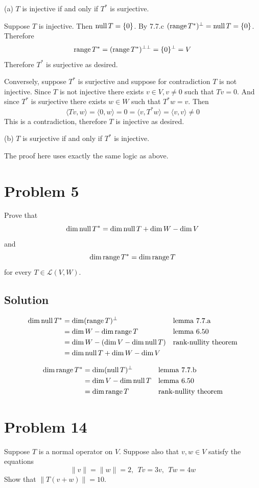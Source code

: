\documentclass{article}
\begin{document}
\vs

(a) $T$ is injective if and only if $T^*$ is surjective.

Suppose $T$ is injective. Then $\text{null}\, T=\{0\}$. By 7.7.c $(\text{range}\, T^*)^\perp=\text{null}\, T=\{0\}$. Therefore
\[\text{range}\, T^*=(\text{range}\, T^*)^{\perp\perp}=\{0\}^\perp=V\]
Therefore $T^*$ is surjective as desired.

\vs

Conversely, suppose $T^*$ is surjective and suppose for contradiction $T$ is not injective. Since $T$ is not injective there exists $v\in V, v\neq 0$ such that $Tv=0$. And since $T^*$ is surjective there exists $w\in W$ such that $T^*w=v$. Then
\[\langle Tv, w\rangle=\langle 0, w\rangle=0=\langle v, T^*w\rangle=\langle v,v\rangle\neq 0\]
This is a contradiction, therefore $T$ is injective as desired.

\vs

(b) $T$ is surjective if and only if $T^*$ is injective.

The proof here uses exactly the same logic as above.

\section*{Problem 5}
Prove that
\[\dim\text{null}\, T^*=\dim\text{null}\, T+\dim W-\dim V\]
and
\[\dim\text{range}\, T^*=\dim\text{range}\, T\]
for every $T\in\mathcal{L}(V,W)$.

\subsection*{Solution}
\begin{align*}
    \dim\text{null}\, T^*&=\dim(\text{range}\, T)^\perp&&\text{lemma 7.7.a}\\
    &=\dim W-\dim\text{range}\, T&&\text{lemma 6.50}\\
    &=\dim W-(\dim V-\dim\text{null}\, T)&&\text{rank-nullity theorem}\\
    &=\dim\text{null}\, T+\dim W-\dim V
\end{align*}

\begin{align*}
    \dim \text{range}\, T^*&=\dim(\text{null}\, T)^\perp&&\text{lemma 7.7.b}\\
    &=\dim V-\dim\text{null}\, T&&\text{lemma 6.50}\\
    &=\dim\text{range}\, T&&\text{rank-nullity theorem}
\end{align*}

\section*{Problem 14}
Suppose $T$ is a normal operator on $V$. Suppose also that $v,w\in V$ satisfy the equations
\[\|v\|=\|w\|=2,\ \ Tv=3v,\ \ Tw=4w\]
Show that $\|T(v+w)\|=10$.
\end{document}
